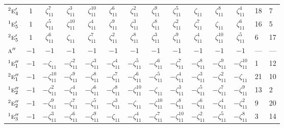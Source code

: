 \documentclass[10pt,a4paper]{article}
\numberwithin{equation}{section}
\newcommand{\irr}[1]{\text{\normalfont\scshape #1}}
\newcommand{\conjpair}[1]{{}^{#1}}
\newcommand{\rootunity}[1]{\zeta_{#1}}
\begin{document}
{\begin{longtable}{@{}lcccccccccccll@{}}
$\conjpair{2}\irr{e}_{4}'$ & $1$ & $\rootunity{11}^{7}$ & $\rootunity{11}^{3}$ & $\rootunity{11}^{10}$ & $\rootunity{11}^{6}$ & $\rootunity{11}^{2}$ & $\rootunity{11}^{9}$ & $\rootunity{11}^{5}$ & $\rootunity{11}$ & $\rootunity{11}^{8}$ & $\rootunity{11}^{4}$ & 18 & 7\\
$\conjpair{1}\irr{e}_{5}'$ & $1$ & $\rootunity{11}^{5}$ & $\rootunity{11}^{10}$ & $\rootunity{11}^{4}$ & $\rootunity{11}^{9}$ & $\rootunity{11}^{3}$ & $\rootunity{11}^{8}$ & $\rootunity{11}^{2}$ & $\rootunity{11}^{7}$ & $\rootunity{11}$ & $\rootunity{11}^{6}$ & 16 & 5\\
$\conjpair{2}\irr{e}_{5}'$ & $1$ & $\rootunity{11}^{6}$ & $\rootunity{11}$ & $\rootunity{11}^{7}$ & $\rootunity{11}^{2}$ & $\rootunity{11}^{8}$ & $\rootunity{11}^{3}$ & $\rootunity{11}^{9}$ & $\rootunity{11}^{4}$ & $\rootunity{11}^{10}$ & $\rootunity{11}^{5}$ & 6 & 17\\
$\irr{a}''$ & $-1$ & $-1$ & $-1$ & $-1$ & $-1$ & $-1$ & $-1$ & $-1$ & $-1$ & $-1$ & $-1$ & --- & ---\\
$\conjpair{1}\irr{e}_{1}''$ & $-1$ & $-\rootunity{11}$ & $-\rootunity{11}^{2}$ & $-\rootunity{11}^{3}$ & $-\rootunity{11}^{4}$ & $-\rootunity{11}^{5}$ & $-\rootunity{11}^{6}$ & $-\rootunity{11}^{7}$ & $-\rootunity{11}^{8}$ & $-\rootunity{11}^{9}$ & $-\rootunity{11}^{10}$ & 1 & 12\\
$\conjpair{2}\irr{e}_{1}''$ & $-1$ & $-\rootunity{11}^{10}$ & $-\rootunity{11}^{9}$ & $-\rootunity{11}^{8}$ & $-\rootunity{11}^{7}$ & $-\rootunity{11}^{6}$ & $-\rootunity{11}^{5}$ & $-\rootunity{11}^{4}$ & $-\rootunity{11}^{3}$ & $-\rootunity{11}^{2}$ & $-\rootunity{11}$ & 21 & 10\\
$\conjpair{1}\irr{e}_{2}''$ & $-1$ & $-\rootunity{11}^{2}$ & $-\rootunity{11}^{4}$ & $-\rootunity{11}^{6}$ & $-\rootunity{11}^{8}$ & $-\rootunity{11}^{10}$ & $-\rootunity{11}$ & $-\rootunity{11}^{3}$ & $-\rootunity{11}^{5}$ & $-\rootunity{11}^{7}$ & $-\rootunity{11}^{9}$ & 13 & 2\\
$\conjpair{2}\irr{e}_{2}''$ & $-1$ & $-\rootunity{11}^{9}$ & $-\rootunity{11}^{7}$ & $-\rootunity{11}^{5}$ & $-\rootunity{11}^{3}$ & $-\rootunity{11}$ & $-\rootunity{11}^{10}$ & $-\rootunity{11}^{8}$ & $-\rootunity{11}^{6}$ & $-\rootunity{11}^{4}$ & $-\rootunity{11}^{2}$ & 9 & 20\\
$\conjpair{1}\irr{e}_{3}''$ & $-1$ & $-\rootunity{11}^{3}$ & $-\rootunity{11}^{6}$ & $-\rootunity{11}^{9}$ & $-\rootunity{11}$ & $-\rootunity{11}^{4}$ & $-\rootunity{11}^{7}$ & $-\rootunity{11}^{10}$ & $-\rootunity{11}^{2}$ & $-\rootunity{11}^{5}$ & $-\rootunity{11}^{8}$ & 3 & 14\\

\end{longtable}}
\end{document}
